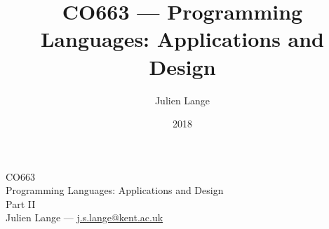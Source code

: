 \documentclass[compress]{beamer}
\title[CO663]{CO663 --- Programming Languages: Applications and Design}
\author[J. Lange]{
  {Julien Lange}
}
\institute{University of Kent}
\date{2018}
\begin{document}




{ %
  \begin{frame}
    \begin{center}
      
      \bigskip

      {\large CO663}
      \\[0.3cm]
      {\huge Programming Languages: Applications and Design}
      \\[0.5cm]
      {\small Part II}
      \\[2cm]
      {Julien Lange --- \href{mailto:j.s.lange@kent.ac.uk}{j.s.lange@kent.ac.uk}}
    \end{center}
  \end{frame}
}


\end{document}
